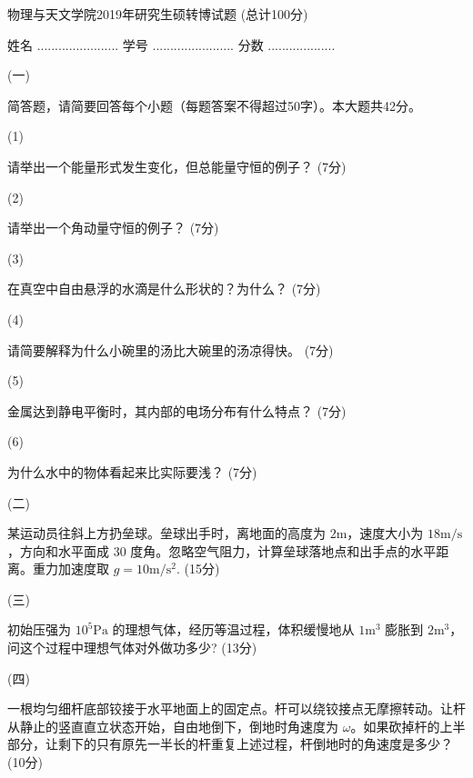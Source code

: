 \documentclass[12pt,CJK]{article}
\def\mark#1{{\color{blue} (#1分)}}
\begin{document}
\bch
{\large 物理与天文学院2019年研究生硕转博试题 (总计100分)}

{\vskip 0.2in}

姓名 ....................... {\hskip 0.5in}    学号 .......................{\hskip 0.5in}  分数 ...................

{\vskip 0.1in}

\bitem
\item[(一)]{简答题，请简要回答每个小题（每题答案不得超过50字）。本大题共42分。
    \bitem
  \item[(1)]{请举出一个能量形式发生变化，但总能量守恒的例子？\mark{7}
      
        \vspace{1.2in}
      }
    \item[(2)]{请举出一个角动量守恒的例子？\mark{7}
        
        \vspace{1.2in}
      }
    \item[(3)]{在真空中自由悬浮的水滴是什么形状的？为什么？\mark{7}
        
        \vspace{1.2in}
      }
    \item[(4)]{请简要解释为什么小碗里的汤比大碗里的汤凉得快。\mark{7}

        
        \vspace{1.2in}
      }
    \item[(5)]{金属达到静电平衡时，其内部的电场分布有什么特点？\mark{7}
        
        \vspace{1.2in}
      }
    \item[(6)]{为什么水中的物体看起来比实际要浅？\mark{7}
        
        \vspace{1.2in}
      }
      \eitem
    }
\item[(二)]{某运动员往斜上方扔垒球。垒球出手时，离地面的高度为 $2\mathrm{m}$，速度大小为 $18\mathrm{m/s}$，方向和水平面成 $30$ 度角。忽略空气阻力，计算垒球落地点和出手点的水平距离。重力加速度取 $g=10\mathrm{m/s^2}$. \mark{15}

    \vspace{4.4in}
  }
\item[(三)]{
    初始压强为 $10^5\mathrm{Pa}$ 的理想气体，经历等温过程，体积缓慢地从 $1\mathrm{m^3}$ 膨胀到 $2\mathrm{m^3}$，问这个过程中理想气体对外做功多少? \mark{13}

    \vspace{4.4in}    
  }
\item[(四)]{一根均匀细杆底部铰接于水平地面上的固定点。杆可以绕铰接点无摩擦转动。让杆从静止的竖直直立状态开始，自由地倒下，倒地时角速度为 $\omega$。如果砍掉杆的上半部分，让剩下的只有原先一半长的杆重复上述过程，杆倒地时的角速度是多少？ \mark{10}

    \vspace{5in}
  }
\end{document}
